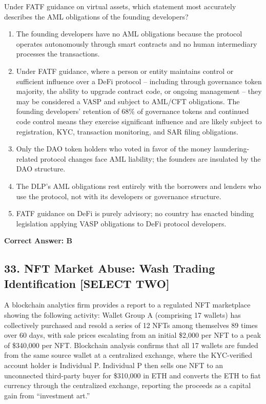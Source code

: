 \documentclass[11pt,a4paper]{article}
\begin{document}
	Under FATF guidance on virtual assets, which statement most accurately describes the AML obligations of the founding developers?
	
	\begin{enumerate}[label=\Alph*.]
		\item The founding developers have no AML obligations because the protocol operates autonomously through smart contracts and no human intermediary processes the transactions.
		\item Under FATF guidance, where a person or entity maintains control or sufficient influence over a DeFi protocol -- including through governance token majority, the ability to upgrade contract code, or ongoing management -- they may be considered a VASP and subject to AML/CFT obligations. The founding developers' retention of 68\% of governance tokens and continued code control means they exercise significant influence and are likely subject to registration, KYC, transaction monitoring, and SAR filing obligations.
		\item Only the DAO token holders who voted in favor of the money laundering-related protocol changes face AML liability; the founders are insulated by the DAO structure.
		\item The DLP's AML obligations rest entirely with the borrowers and lenders who use the protocol, not with its developers or governance structure.
		\item FATF guidance on DeFi is purely advisory; no country has enacted binding legislation applying VASP obligations to DeFi protocol developers.
	\end{enumerate}
	\textbf{Correct Answer: B}
	
	\subsection{33. NFT Market Abuse: Wash Trading Identification \textnormal{[SELECT TWO]}}
	
	A blockchain analytics firm provides a report to a regulated NFT marketplace showing the following activity: Wallet Group A (comprising 17 wallets) has collectively purchased and resold a series of 12 NFTs among themselves 89 times over 60 days, with sale prices escalating from an initial \$2,000 per NFT to a peak of \$340,000 per NFT. Blockchain analysis confirms that all 17 wallets are funded from the same source wallet at a centralized exchange, where the KYC-verified account holder is Individual P. Individual P then sells one NFT to an unconnected third-party buyer for \$310,000 in ETH and converts the ETH to fiat currency through the centralized exchange, reporting the proceeds as a capital gain from ``investment art.''
	
\end{document}
